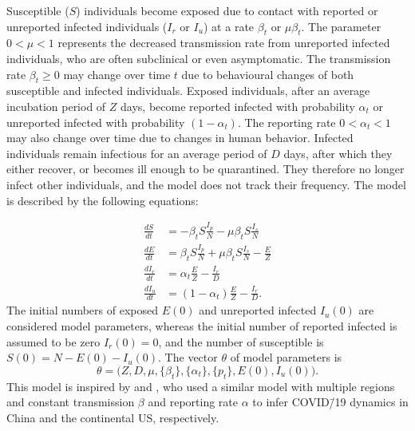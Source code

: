 \documentclass[12pt]{extarticle}
\begin{document}
Susceptible ($S$) individuals become exposed due to contact with reported or unreported infected individuals ($I_r$ or $I_u$) at a rate $\beta_t$ or $\mu \beta_t$.
The parameter $0 < \mu < 1$ represents the decreased transmission rate from unreported infected individuals, who are often subclinical or even asymptomatic.
The transmission rate $\beta_t \ge 0$ may change over  time $t$ due to behavioural changes of both susceptible and infected individuals.
Exposed individuals, after an average incubation period of $Z$ days, become reported infected with probability $\alpha_t$ or unreported infected with probability $(1-\alpha_t)$.
The reporting rate $0 < \alpha_t < 1$ may also change over time due to changes in human behavior.
Infected individuals remain infectious for an average period of $D$ days, after which they either recover, or becomes ill enough to be quarantined.
They therefore no longer infect other individuals, and the model does not track their frequency.
The model is described by the following equations:

\begin{equation} \label{eq:model}
\begin{aligned}
\frac{dS}{dt} & = -\beta_t S \frac{I_p}{N} - \mu \beta_t S \frac{I_s}{N} \\
\frac{dE}{dt} & = \beta_t S \frac{I_p}{N} + \mu \beta_t S \frac{I_s}{N}  - \frac{E}{Z} \\
\frac{dI_r}{dt} & = \alpha_t \frac{E}{Z} - \frac{I_r}{D} \\
\frac{dI_u}{dt} & = (1-\alpha_t) \frac{E}{Z} - \frac{I_r}{D} .
\end{aligned}
\end{equation}
The initial numbers of exposed $E(0)$ and unreported infected $I_u(0)$ are considered model parameters, whereas the initial number of reported infected is assumed to be zero $I_r(0)=0$, and the number of susceptible is $S(0)=N-E(0)-I_u(0)$.
The vector $\theta$ of model parameters is
\begin{equation} \label{eq:theta}
\theta=\Big(Z, D, \mu, \{\beta_t\}, \{\alpha_t\}, \{p_t\}, E(0), I_u(0)\Big).
\end{equation}
This model is inspired by \citet{Li2020} and \citet{Pei2020}, who used a similar model with multiple regions and constant transmission $\beta$ and reporting rate $\alpha$ to infer COVID\=/19 dynamics in China and the continental US, respectively.



\end{document}
